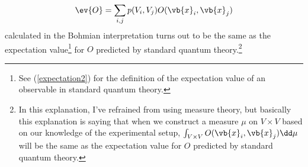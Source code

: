 \documentclass[12pt]{report}
\begin{document}
\begin{equation}\label{bohmconsistency}
\ev{O}=\sum_{i,j}p(V_i, V_j)O(\vb{x}_i, \vb{x}_j)
\end{equation}
calculated %
%
in the Bohmian interpretation turns out to be the same as the expectation value\footnote{See (\ref{expectation2}) for the definition of the expectation value of an observable in standard quantum theory.} for $O$ predicted by standard quantum theory.\footnote{In this explanation, I've refrained from using measure theory, but basically this explanation is saying that when we construct a measure $\mu$ on $V\times V$ based on our knowledge of the experimental setup,  $\int_{V\times V}O(\vb{x}_i, \vb{x}_j)\dd\mu$ will be the same as the expectation value for $O$ predicted by standard quantum theory. }
\end{document}
